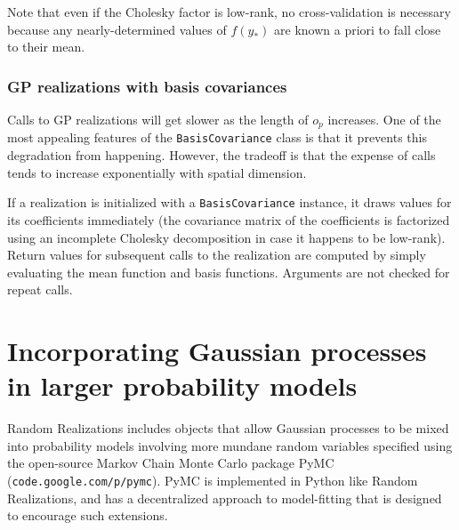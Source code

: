 \documentclass{report}
\begin{document}
Note that even if the Cholesky factor is low-rank, no cross-validation is necessary because any nearly-determined values of $f(y_*)$ are known a priori to fall close to their mean.

\subsection{GP realizations with basis covariances} 
Calls to GP realizations will get slower as the length of $o_p$ increases. One of the most appealing features of the \texttt{BasisCovariance} class is that it prevents this degradation from happening. However, the tradeoff is that the expense of calls tends to increase exponentially with spatial dimension.

If a realization is initialized with a \texttt{BasisCovariance} instance, it draws values for its coefficients immediately (the covariance matrix of the coefficients is factorized using an incomplete Cholesky decomposition in case it happens to be low-rank). Return values for subsequent calls to the realization are computed by simply evaluating the mean function and basis functions. Arguments are not checked for repeat calls.

\chapter{Incorporating Gaussian processes in larger probability models}\label{sec:PyMC} 

Random Realizations includes objects that allow Gaussian processes to be mixed into probability models involving more mundane random variables specified using the open-source Markov Chain Monte Carlo package PyMC (\texttt{code.google.com/p/pymc}). PyMC is implemented in Python like Random Realizations, and has a decentralized approach to model-fitting that is designed to encourage such extensions.
\end{document}
